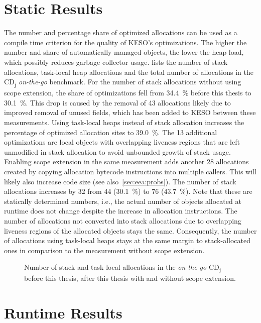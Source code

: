 	\section{Static Results}
		\label{sec:eval:static}
		The number and percentage share of optimized allocations can be used as a compile time criterion for the quality of
		KESO's optimizations. The higher the number and share of automatically managed objects, the lower the heap load,
		which possibly reduces garbage collector usage.  lists the number of stack
		allocations, task-local heap allocations and the total number of allocations in the CD\textsubscript{j}
		\emph{on-the-go} benchmark. For the number of stack allocations without using scope extension, the share of
		optimizations fell from 34.4~\% before this thesis to 30.1~\%. This drop is caused by the removal of 43 allocations
		likely due to improved removal of unused fields, which has been added to KESO between these measurements. Using
		task-local heaps instead of stack allocation increases the percentage of optimized allocation sites to 39.0~\%. The
		13 additional optimizations are local objects with overlapping liveness regions that are left unmodified in stack
		allocation to avoid unbounded growth of stack usage. Enabling scope extension in the same measurement adds another
		28 allocations created by copying allocation bytecode instructions into multiple callers. This will likely also
		increase code size (see also~\cref{sec:eea:probs}). The number of stack allocations increases by 32 from 44
		(30.1~\%) to 76 (43.7~\%). Note that these are statically determined numbers, i.e., the actual number of objects
		allocated at runtime does not change despite the increase in allocation instructions. The number of allocations not
		converted into stack allocations due to overlapping liveness regions of the allocated objects stays the same.
		Consequently, the number of allocations using task-local heaps stays at the same margin to stack-allocated ones in
		comparison to the measurement without scope extension.

		\begin{figure}
			\centering
			

			\caption{%
				Number of stack and task-local allocations in the \emph{on-the-go} CD\textsubscript{j} before this thesis, after
				this thesis with and without scope extension.}
			\label{fig:eval:static:numallocs}
		\end{figure}

	\section{Runtime Results}
		\label{sec:eval:runtime}
